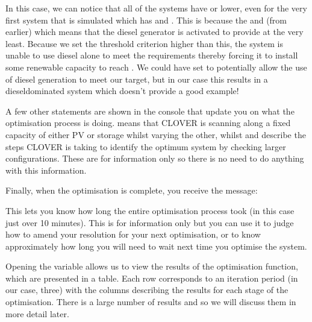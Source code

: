 \documentclass[letterpaper,10pt,english]{sphinxmanual}
\begin{document}
\sphinxAtStartPar
In this case, we can notice that all of the systems have
 or lower, even for the very first system that is
simulated which has  and . This is
because the  and 
(from earlier) which means that the diesel
generator is activated to provide  at the very least.
Because we set the threshold criterion higher than this, the system is
unable to use diesel alone to meet the requirements thereby forcing it
to install some renewable capacity to reach . We
could have set  to potentially allow
the use of diesel generation to meet our target, but in our case this
results in a diesel\sphinxhyphen{}dominated system which doesn’t provide a good
example!

\sphinxAtStartPar
A few other statements are shown in the console that update you on what
the optimisation process is doing. 
means that CLOVER is scanning along a fixed capacity of either PV or
storage whilst varying the other, whilst  and
 describe the steps CLOVER is taking to identify
the optimum system by checking larger configurations. These are for
information only so there is no need to do anything with this
information.

\sphinxAtStartPar
Finally, when the optimisation is complete, you receive the message:

\begin{sphinxVerbatim}[commandchars=\\\{\}]
     
\end{sphinxVerbatim}

\sphinxAtStartPar
This lets you know how long the entire optimisation process took (in
this case just over 10 minutes). This is for information only but you
can use it to judge how to amend your resolution for your next
optimisation, or to know approximately how long you will need to wait
next time you optimise the system.

\sphinxAtStartPar
Opening the  variable allows us to view the
results of the optimisation function, which are presented in a table.
Each row corresponds to an iteration period (in our case, three) with
the columns describing the results for each stage of the optimisation.
There is a large number of results and so we will discuss them in more
detail later.
\end{document}
